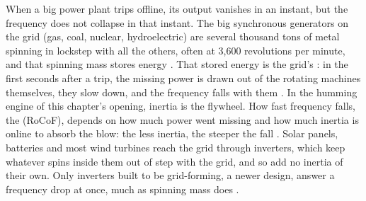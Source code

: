 When a big power plant trips offline, its output vanishes in an instant, but the frequency does not collapse in that instant.
The big synchronous generators on the grid (gas, coal, nuclear, hydroelectric) are several thousand tons of metal spinning in lockstep with all the others, often at 3,600 revolutions per minute, and that spinning mass stores energy \autocite{FERCNERCFeb2021,ercot2024asstudy}. %
That stored energy is the grid's : in the first seconds after a trip, the missing power is drawn out of the rotating machines themselves, they slow down, and the frequency falls with them \autocite{ercot2018inertia,NERCBalancingFrequency2021}. %
In the humming engine of this chapter's opening, inertia is the flywheel.
How fast frequency falls, the  (RoCoF), depends on how much power went missing and how much inertia is online to absorb the blow: the less inertia, the steeper the fall \autocite{ercot2018inertia}. %
Solar panels, batteries and most wind turbines reach the grid through inverters, which keep whatever spins inside them out of step with the grid, and so add no inertia of their own. Only inverters built to be grid-forming, a newer design, answer a frequency drop at once, much as spinning mass does \autocite{nerc2021gfm}. %
